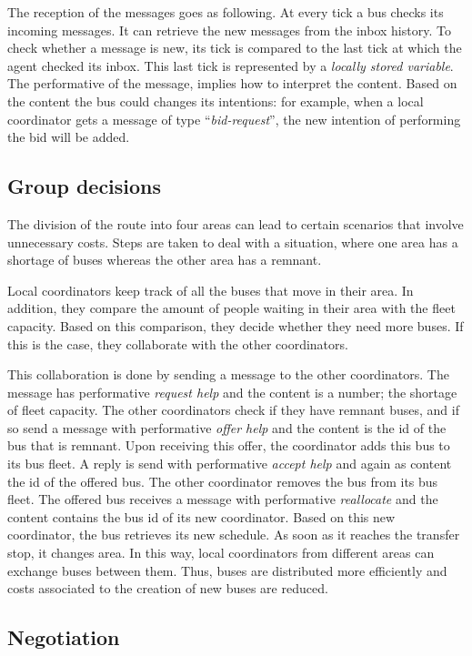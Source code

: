 The reception of the messages goes as following. At every tick a bus checks its incoming messages. It can retrieve the new messages from the inbox history. To check whether a message is new, its tick is compared to the last tick at which the agent checked its inbox. This last tick is represented by a \textit{locally stored variable}. The performative of the message, implies how to interpret the content. Based on the content the bus could changes its intentions: for example, when a local coordinator gets a message of type ``\textit{bid-request}'', the new intention of performing the bid will be added.

\subsection{Group decisions}

The division of the route into four areas can lead to certain scenarios that involve unnecessary costs. Steps are taken to deal with a situation, where one area has a shortage of buses whereas the other area has a remnant. 

Local coordinators keep track of all the buses that move in their area. In addition, they compare the amount of people waiting in their area with the fleet capacity. Based on this comparison, they decide whether they need more buses. If this is the case, they collaborate with the other coordinators. 

This collaboration is done by sending a message to the other coordinators. The message has performative \textit{request help} and the content is a number; the shortage of fleet capacity. The other coordinators check if they have remnant buses, and if so send a message with performative \textit{offer help} and the content is the id of the bus that is remnant. Upon receiving this offer, the coordinator adds this bus to its bus fleet. A reply is send with performative \textit{accept help} and again as content the id of the offered bus. The other coordinator removes the bus from its bus fleet. The offered bus receives a message with performative \textit{reallocate} and the content contains the bus id of its new coordinator. Based on this new coordinator, the bus retrieves its new schedule. As soon as it reaches the transfer stop, it changes area. In this way, local coordinators from different areas can exchange buses between them. Thus, buses are distributed more efficiently and costs associated to the creation of new buses are reduced.

\subsection{Negotiation}
\label{subsec:negotiations}

